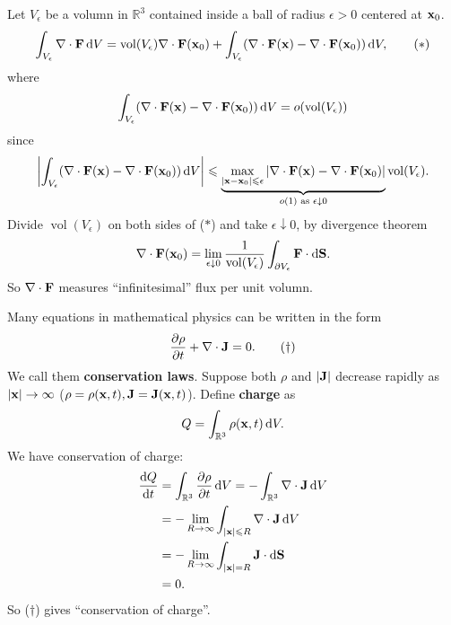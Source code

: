 \begin{example}
    Let $ V_\epsilon $ be a volumn in $ \mathbb{R}^{3} $ contained inside a ball of radius $ \epsilon>0 $ centered at $ {\bf x}_0 $.
    \[
        \int_{V_{\epsilon}} \nabla\cdot {\bf F} \,\mathrm{d}V = \operatorname{vol}(V_\epsilon)\nabla\cdot{\bf F}({\bf x}_0)+\int_{V_\epsilon} (\nabla\cdot{\bf F}({\bf x})-\nabla\cdot{\bf F}({\bf x}_0)) \,\mathrm{d}V,\tag{$*$}
    \]
    where 
    \[
        \int_{V_\epsilon} (\nabla\cdot{\bf F}({\bf x})-\nabla\cdot{\bf F}({\bf x}_0)) \,\mathrm{d}V= o(\operatorname{vol}(V_\epsilon) )
    \]
    since 
    \[
        \left| \int_{V_\epsilon} (\nabla\cdot{\bf F}({\bf x})-\nabla\cdot{\bf F}({\bf x}_0)) \,\mathrm{d}V \right| \leqslant \underbrace{\max_{|{\bf x}-{\bf x}_0|\leqslant \epsilon} \left| \nabla\cdot{\bf F}({\bf x})-\nabla\cdot{\bf F}({\bf x}_0) \right|}_{o(1) \text{ as }\epsilon \downarrow 0} \operatorname{vol}(V_\epsilon) .
    \]
    Divide $ \operatorname{vol}(V_\epsilon)  $ on both sides of ($\ast$) and take $ \epsilon \downarrow 0 $, by divergence theorem 
    \[
        \nabla\cdot {\bf F}({\bf x}_0) = \lim_{\epsilon \downarrow 0} \frac{1}{\operatorname{vol}(V_\epsilon) }  \int_{\partial V_{\epsilon}} {\bf F} \cdot\mathrm{d}\mathbf{S}.
    \]
    So $ \nabla\cdot{\bf F} $ measures ``infinitesimal'' flux per unit volumn.
\end{example}
\begin{example}
    Many equations in mathematical physics can be written in the form 
    \[
        \frac{\partial \rho}{\partial t}+ \nabla\cdot {\bf J} = 0. \tag{$ \dagger $}
    \]
    We call them \textbf{conservation laws}. Suppose both $ \rho $ and $ |{\bf J}| $ decrease rapidly as $ |{\bf x}|\to \infty $ ($ \rho=\rho({\bf x},t),{\bf J}={\bf J}({\bf x},t) $). Define \textbf{charge} as 
    \[
        Q = \int_{\mathbb{R}^{3}} \rho({\bf x},t) \,\mathrm{d}V.
    \]
    We have conservation of charge: 
    \begin{align*}
        \frac{\mathrm{d}Q}{\mathrm{d}t} &=  \int_{\mathbb{R}^{3}} \frac{\partial \rho}{\partial t}  \,\mathrm{d}V = -\int_{\mathbb{R}^{3}} \nabla\cdot{\bf J} \,\mathrm{d}V\\ 
        &= - \lim_{R \to \infty} \int_{|{\bf x}|\leqslant R} \nabla\cdot{\bf J} \,\mathrm{d}V\\ 
        &= - \lim_{R \to \infty} \int_{|{\bf x}|=R} {\bf J} \cdot\mathrm{d}\mathbf{S}\\ 
        &= 0.
    \end{align*}
    So ($ \dagger $) gives ``conservation of charge''.
\end{example}

